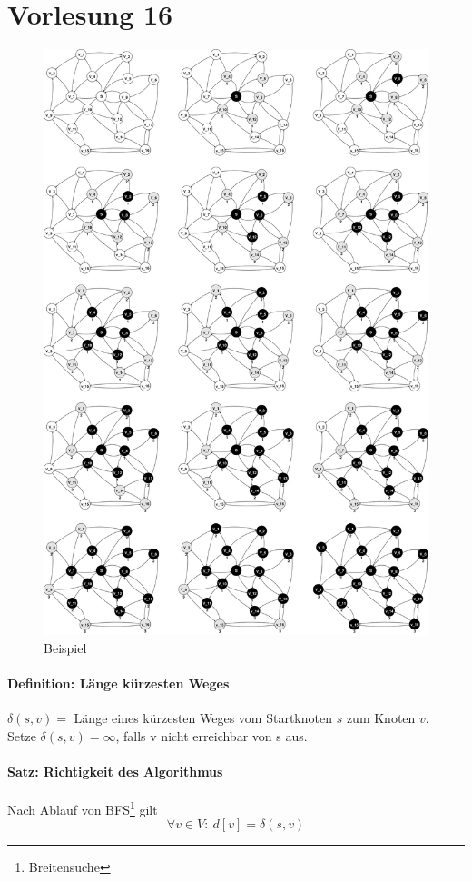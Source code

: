 \chapter{Vorlesung 16}

\begin{figure}[H]
\centering
\includegraphics[width=0.9\linewidth]{16/Grafik/Diagramm}
\caption{Beispiel}
\label{fig:Diagramm}
\end{figure}


\subsubsection{Definition: Länge kürzesten Weges}
$\delta(s,v)=$ Länge eines kürzesten Weges vom Startknoten $s$ zum Knoten $v$.\\
Setze $\delta(s,v)=\infty$, falls v nicht erreichbar von s aus.
\subsubsection{Satz: Richtigkeit des Algorithmus}
Nach Ablauf von BFS\footnote{Breitensuche} gilt 
\[ \forall v\in V: ~ d[v]=\delta(s,v) \]
